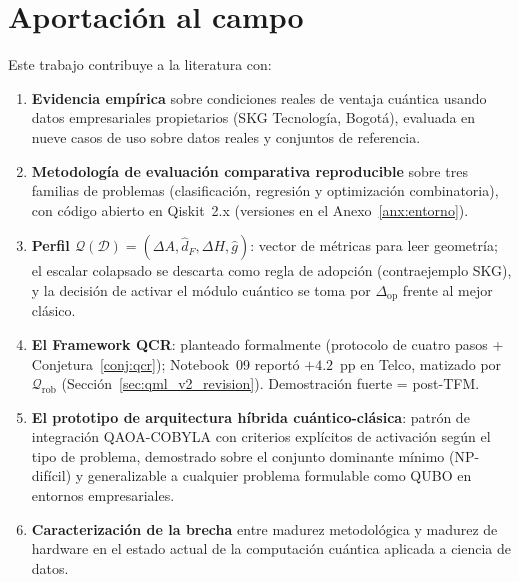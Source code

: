 \section{Aportación al campo}

Este trabajo contribuye a la literatura con:
\begin{enumerate}
    \item \textbf{Evidencia empírica} sobre condiciones reales de ventaja cuántica usando datos empresariales propietarios (SKG Tecnología, Bogotá), evaluada en nueve casos de uso sobre datos reales y conjuntos de referencia.
    \item \textbf{Metodología de evaluación comparativa reproducible} sobre tres familias de problemas (clasificación, regresión y optimización combinatoria), con código abierto en Qiskit~2.x (versiones en el Anexo~\ref{anx:entorno}).
    \item \textbf{Perfil $\mathcal{Q}(\mathcal{D})=(\Delta A,\hat{d}_F,\Delta H,\hat{g})$}: vector de métricas para leer geometría; el escalar colapsado se descarta como regla de adopción (contraejemplo SKG), y la decisión de activar el módulo cuántico se toma por $\Delta_{\mathrm{op}}$ frente al mejor clásico.
    \item \textbf{El Framework QCR}: planteado formalmente (protocolo de cuatro pasos + Conjetura~\ref{conj:qcr}); Notebook~09 reportó $+4.2$~pp en Telco, matizado por $\mathcal{Q}_{\mathrm{rob}}$ (Sección~\ref{sec:qml_v2_revision}). Demostración fuerte = post-TFM.
    \item \textbf{El prototipo de arquitectura híbrida cuántico-clásica}: patrón de integración QAOA-COBYLA con criterios explícitos de activación según el tipo de problema, demostrado sobre el conjunto dominante mínimo (NP-difícil) y generalizable a cualquier problema formulable como QUBO en entornos empresariales.
    \item \textbf{Caracterización de la brecha} entre madurez metodológica y madurez de hardware en el estado actual de la computación cuántica aplicada a ciencia de datos.
\end{enumerate}